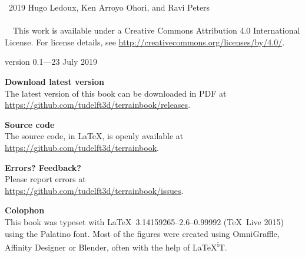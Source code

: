 
\clearpage
\thispagestyle{empty}
\null%
\vfill


\textcopyright\ 2019 Hugo Ledoux, Ken Arroyo Ohori, and Ravi Peters
\\ \\
\ccLogo\ \ccAttribution\ This work is available under a Creative Commons Attribution 4.0 International License.
For license details, see \url{http://creativecommons.org/licenses/by/4.0/}.


version 0.1---23 July 2019


\textbf{Download latest version} \\
The latest version of this book can be downloaded in PDF at\\ 
\url{https://github.com/tudelft3d/terrainbook/releases}.


\textbf{Source code} \\
The source code, in \LaTeX, is openly available at\\
\url{https://github.com/tudelft3d/terrainbook}.


\textbf{Errors? Feedback?} \\
Please report errors at\\
\url{https://github.com/tudelft3d/terrainbook/issues}.

\textbf{Colophon} \\
This book was typeset with \LaTeX\ 3.14159265--2.6--0.99992 (\TeX\ Live 2015) using the Palatino font.
Most of the figures were created using OmniGraffle, Affinity Designer or Blender, often with the help of \LaTeX{}\textsuperscript{i}T.

